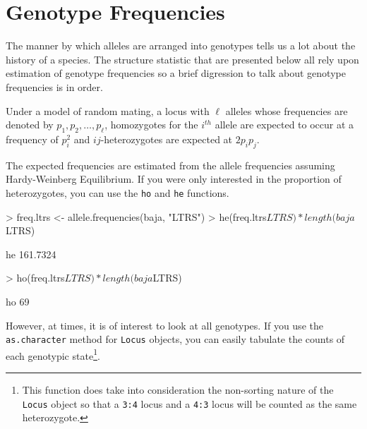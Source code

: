 \documentclass[letterpaper,twoside,openany]{book}
\begin{document}
\begin{Schunk}
\end{Schunk}

\section{Genotype Frequencies}

The manner by which alleles are arranged into genotypes tells us a lot about the history of a species.  The structure statistic that are presented below all rely upon estimation of genotype frequencies so a brief digression to talk about genotype frequencies is in order.

Under a model of random mating, a locus with $\ell$ alleles whose frequencies are denoted by $p_1, p_2, \ldots, p_\ell$, homozygotes for the $i^{th}$ allele are expected to occur at a frequency of $p_i^2$ and $ij$-heterozygotes are expected at $2p_ip_j$.


The expected frequencies are estimated from the allele frequencies assuming Hardy-Weinberg Equilibrium.  If you were only interested in the proportion of heterozygotes, you can use the \texttt{ho} and \texttt{he} functions.   

\begin{Schunk}
\begin{Sinput}
> freq.ltrs <- allele.frequencies(baja, "LTRS")
> he(freq.ltrs$LTRS)*length(baja$LTRS)
\end{Sinput}
\begin{Soutput}
      he 
161.7324 
\end{Soutput}
\begin{Sinput}
> ho(freq.ltrs$LTRS)*length(baja$LTRS)
\end{Sinput}
\begin{Soutput}
ho 
69 
\end{Soutput}
\end{Schunk}

However, at times, it is of interest to look at all genotypes.  If you use the \texttt{as.character} method for \texttt{Locus} objects, you can easily tabulate the counts of each genotypic state\footnote{This function does take into consideration the non-sorting nature of the \texttt{Locus} object so that a \texttt{3:4} locus and a \texttt{4:3} locus will be counted as the same heterozygote.}. 
\end{document}

